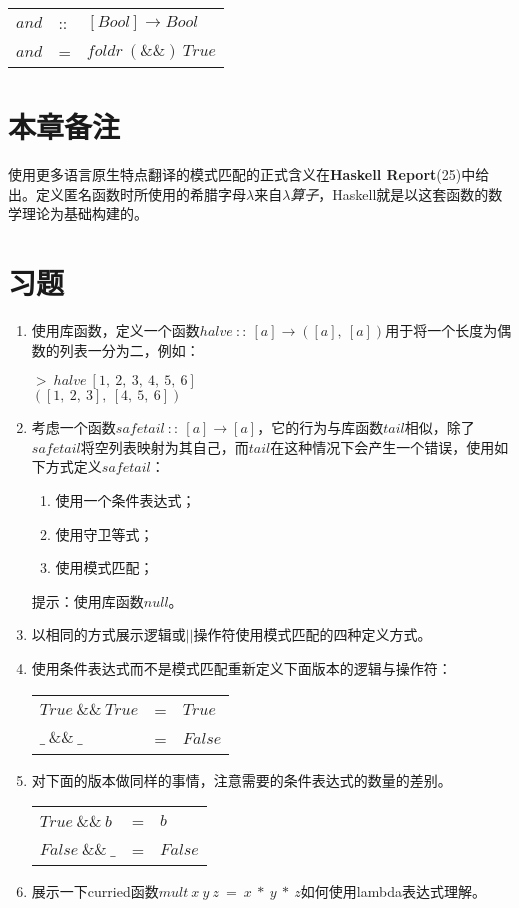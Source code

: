 \begin{tabular}[t]{lll}
$and$&::&$[Bool] \rightarrow Bool$\\
$and$&=&$foldr~(\&\&)~True$\\
\end{tabular}

\section{本章备注}
使用更多语言原生特点翻译的模式匹配的正式含义在\textbf{Haskell
Report}(25)中给出。定义匿名函数时所使用的希腊字母$\lambda$来自$\lambda$\textit{算子}，Haskell就是以这套函数的数学理论为基础构建的。

\section{习题} 

\begin{enumerate}

\item 使用库函数，定义一个函数$halve~::~[a] \rightarrow([a], ~[a])$用于将一个长度为偶数的列表一分为二，例如：

\noindent\hspace*{1cm} $>~ halve~[1,~2,~3,~4,~5,~6]$\\
\hspace*{1cm} $([1,~2,~3],~[4,~5,~6])$

\item 考虑一个函数$safetail~::~[a] \rightarrow
[a]$，它的行为与库函数$tail$相似，除了$safetail$将空列表映射为其自己，而$tail$在这种情况下会产生一个错误，使用如下方式定义$safetail$： 
\begin{enumerate}
\item 使用一个条件表达式； 
\item 使用守卫等式； 
\item 使用模式匹配； 
\end{enumerate}

提示：使用库函数$null$。

\item 以相同的方式展示逻辑或$||$操作符使用模式匹配的四种定义方式。

\item 使用条件表达式而不是模式匹配重新定义下面版本的逻辑与操作符：

\begin{tabular}[t]{lll}
$True~\&\&~True$&=&$True$\\
$\_~\&\&~\_$&=&$False$\\
\end{tabular}

\item 对下面的版本做同样的事情，注意需要的条件表达式的数量的差别。

\begin{tabular}[t]{lll}
$True~\&\&~b$&=&$b$\\
$False~\&\&~\_$&=&$False$\\
\end{tabular}

\item 展示一下curried函数$mult~x~y~z~=~x~*~y~*~z$如何使用lambda表达式理解。

\end{enumerate}

